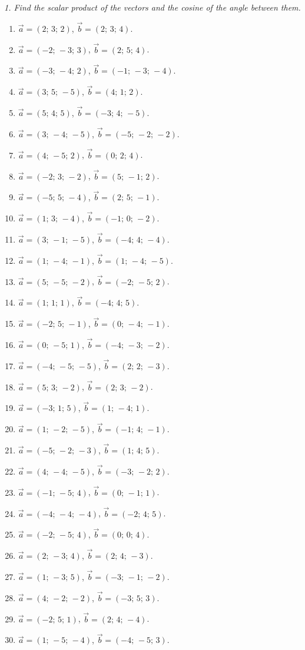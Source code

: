 \emph{1. Find the scalar product of the vectors and the cosine of the angle between them.}
\bigskip
\begin{enumerate}[label=\arabic*., leftmargin=*]
\item $\vec a=(2;\,3;\,2)$, $\vec b=(2;\,3;\,4)$.
\item $\vec a=(-2;\,-3;\,3)$, $\vec b=(2;\,5;\,4)$.
\item $\vec a=(-3;\,-4;\,2)$, $\vec b=(-1;\,-3;\,-4)$.
\item $\vec a=(3;\,5;\,-5)$, $\vec b=(4;\,1;\,2)$.
\item $\vec a=(5;\,4;\,5)$, $\vec b=(-3;\,4;\,-5)$.
\item $\vec a=(3;\,-4;\,-5)$, $\vec b=(-5;\,-2;\,-2)$.
\item $\vec a=(4;\,-5;\,2)$, $\vec b=(0;\,2;\,4)$.
\item $\vec a=(-2;\,3;\,-2)$, $\vec b=(5;\,-1;\,2)$.
\item $\vec a=(-5;\,5;\,-4)$, $\vec b=(2;\,5;\,-1)$.
\item $\vec a=(1;\,3;\,-4)$, $\vec b=(-1;\,0;\,-2)$.
\item $\vec a=(3;\,-1;\,-5)$, $\vec b=(-4;\,4;\,-4)$.
\item $\vec a=(1;\,-4;\,-1)$, $\vec b=(1;\,-4;\,-5)$.
\item $\vec a=(5;\,-5;\,-2)$, $\vec b=(-2;\,-5;\,2)$.
\item $\vec a=(1;\,1;\,1)$, $\vec b=(-4;\,4;\,5)$.
\item $\vec a=(-2;\,5;\,-1)$, $\vec b=(0;\,-4;\,-1)$.
\item $\vec a=(0;\,-5;\,1)$, $\vec b=(-4;\,-3;\,-2)$.
\item $\vec a=(-4;\,-5;\,-5)$, $\vec b=(2;\,2;\,-3)$.
\item $\vec a=(5;\,3;\,-2)$, $\vec b=(2;\,3;\,-2)$.
\item $\vec a=(-3;\,1;\,5)$, $\vec b=(1;\,-4;\,1)$.
\item $\vec a=(1;\,-2;\,-5)$, $\vec b=(-1;\,4;\,-1)$.
\item $\vec a=(-5;\,-2;\,-3)$, $\vec b=(1;\,4;\,5)$.
\item $\vec a=(4;\,-4;\,-5)$, $\vec b=(-3;\,-2;\,2)$.
\item $\vec a=(-1;\,-5;\,4)$, $\vec b=(0;\,-1;\,1)$.
\item $\vec a=(-4;\,-4;\,-4)$, $\vec b=(-2;\,4;\,5)$.
\item $\vec a=(-2;\,-5;\,4)$, $\vec b=(0;\,0;\,4)$.
\item $\vec a=(2;\,-3;\,4)$, $\vec b=(2;\,4;\,-3)$.
\item $\vec a=(1;\,-3;\,5)$, $\vec b=(-3;\,-1;\,-2)$.
\item $\vec a=(4;\,-2;\,-2)$, $\vec b=(-3;\,5;\,3)$.
\item $\vec a=(-2;\,5;\,1)$, $\vec b=(2;\,4;\,-4)$.
\item $\vec a=(1;\,-5;\,-4)$, $\vec b=(-4;\,-5;\,3)$.
\end{enumerate}

